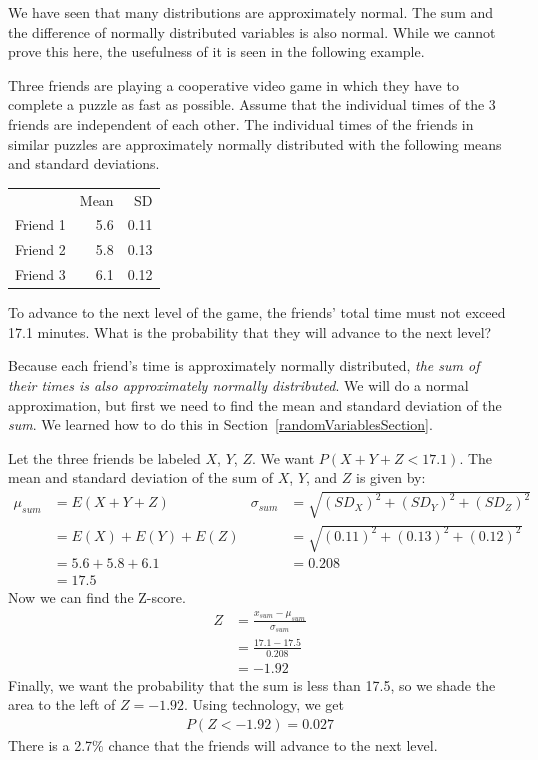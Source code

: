 We have seen that many distributions are approximately normal. The sum and the difference of normally distributed variables is also normal. While we cannot prove this here, the usefulness of it is seen in the following example.

\begin{examplewrap}
\begin{nexample}{Three friends are playing a cooperative video game in which they have to complete a puzzle as fast as possible. Assume that the individual times of the 3 friends are independent of each other. The individual times of the friends in similar puzzles are approximately normally distributed with the following means and standard deviations. 
\begin{center}
\begin{tabular}{lrr}
& Mean &  SD \\
Friend 1 	& 5.6 & 0.11  \\
Friend 2 	& 5.8  & 0.13 \\
Friend 3 	& 6.1  & 0.12  
\end{tabular}
\end{center}
To advance to the next level of the game, the friends' total time must not exceed 17.1 minutes. What is the probability that they will advance to the next level?}
Because each friend's time is approximately normally distributed, \emph{the sum of their times is also approximately normally distributed}. We will do a normal approximation, but first we need to find the mean and standard deviation of the \emph{sum}. We learned how to do this in Section~\ref{randomVariablesSection}.

Let the three friends be labeled $X$, $Y$, $Z$. We want $P(X + Y + Z < 17.1)$. The mean and standard deviation of the sum of $X$, $Y$, and $Z$ is given by:
\begin{align*}
\mu_{sum} &= E(X+Y+Z)
	& \sigma_{sum}&= \sqrt{(SD_X)^2+(SD_Y)^2 + (SD_Z)^2} \\
&= E(X) + E(Y) + E(Z)
	& &= \sqrt{(0.11)^2+(0.13)^2+(0.12)^2}\\
&=5.6+5.8+6.1
	& &= 0.208 \\
&=17.5
\end{align*}
Now we can find the Z-score. 
\begin{align*}
Z &= \frac{x_{sum}-\mu_{sum}}{\sigma_{sum}} \\
&=\frac{17.1-17.5}{0.208} \\
&=-1.92
\end{align*}
Finally, we want the probability that the sum is less than 17.5, so we shade the area to the left of $Z = -1.92$. Using technology, we get
\begin{align*}
P(Z < -1.92) = 0.027
\end{align*}
There is a 2.7\% chance that the friends will advance to the next level.
\end{nexample}
\end{examplewrap}

